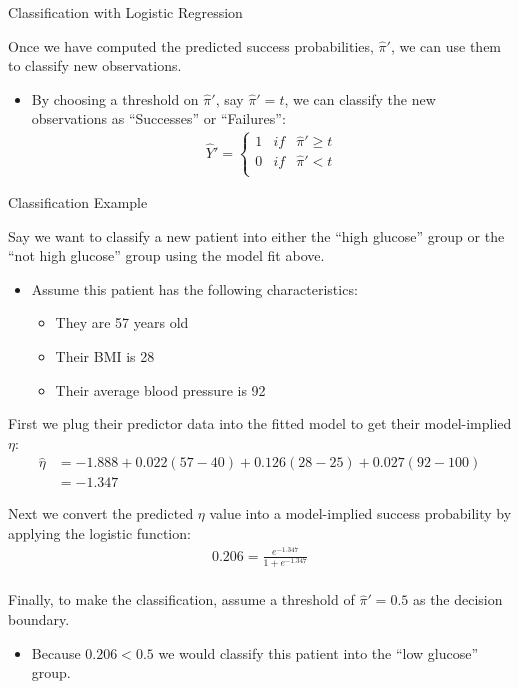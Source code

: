 \documentclass{beamer}\usepackage[]{graphicx}\usepackage[]{color}
\begin{document}
\begin{frame}{Classification with Logistic Regression}
  
  Once we have computed the predicted success probabilities, $\hat{\pi}'$, we 
  can use them to classify new observations.
  \vc
  \begin{itemize}
  \item By choosing a threshold on $\hat{\pi}'$, say $\hat{\pi}' = t$, we can 
    classify the new observations as ``Successes'' or ``Failures'':
    \begin{align*}
      \hat{Y}' = \left\{ 
      \begin{array}{ccc}
        1 & if & \hat{\pi}' \geq t\\
        0 & if & \hat{\pi}' < t\\
      \end{array}
      \right.
    \end{align*}
    
  \end{itemize}
  
\end{frame}


\begin{frame}[allowframebreaks]{Classification Example}
  


Say we want to classify a new patient into either the ``high glucose'' group 
or the ``not high glucose'' group using the model fit above.
\begin{itemize}
\item Assume this patient has the following characteristics:
  \begin{itemize}
  \item They are 57 years old
  \item Their BMI is 28
  \item Their average blood pressure is 92
  \end{itemize}
\end{itemize}
\vb
First we plug their predictor data into the fitted model to get their 
model-implied $\eta$:
\begin{align*}
  \hat{\eta} &= -1.888 + 0.022 (57 - 40) + 0.126 (28 - 25) + 0.027 (92 - 100)\\
  &= -1.347 
\end{align*}

\pagebreak

Next we convert the predicted $\eta$ value into a model-implied success
probability by applying the logistic function:
\begin{align*}
  0.206 = \frac{e^{-1.347}}{1 + e^{-1.347}}
\end{align*}\\
\vb
Finally, to make the classification, assume a threshold of $\hat{\pi}' = 0.5$ as 
the decision boundary.
\begin{itemize}
\item Because $0.206 < 0.5$ we would classify this 
  patient into the ``low glucose'' group.
\end{itemize}

\end{frame}
   
\end{document}
